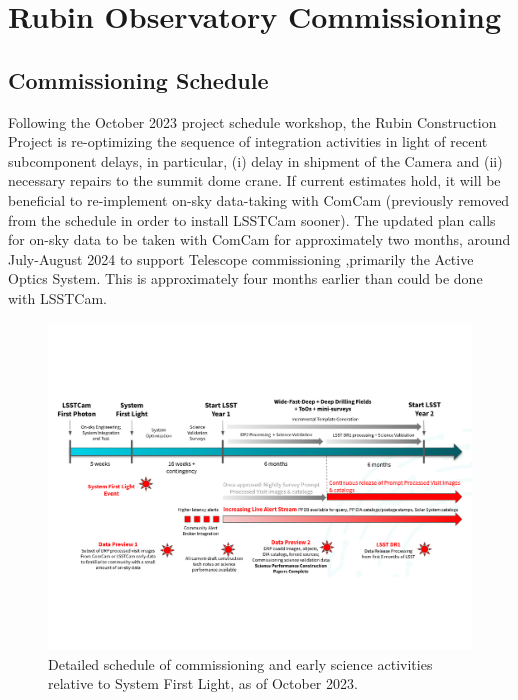 \section{Rubin Observatory Commissioning}
\label{sec:commissioning}

\subsection{Commissioning Schedule}
\label{ssec:commissioning-schedule}

Following the October 2023 project schedule workshop, the Rubin Construction Project is re-optimizing the sequence of integration activities in light of recent subcomponent delays, in particular, (i) delay in shipment of the Camera and (ii) necessary repairs to the  summit dome crane.
If current estimates hold, it will be beneficial to re-implement on-sky data-taking with ComCam (previously removed from the schedule in order to install LSSTCam sooner).
The updated plan calls for on-sky data to be taken with ComCam for approximately two months, around July-August 2024 to support Telescope commissioning ,primarily the Active Optics System. 
This is approximately four months earlier than could be done with LSSTCam. 

\begin{figure}[htb]
\centering
\includegraphics[width=0.98\linewidth]{figures/rubinobs_on-sky_commissioning_and_early_science.pdf}
\caption{Detailed schedule of commissioning  and early science activities relative to System First Light, as of October 2023.}
\label{fig:commissioning-es-schedule}
\vspace{0.1cm}
\end{figure}

